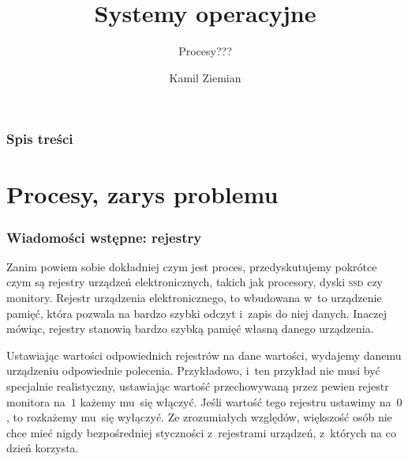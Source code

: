 \documentclass[10pt,t]{beamer}
\title{Systemy operacyjne}
\subtitle{Procesy???}
\author{Kamil Ziemian \\
  \email}
\begin{document}





\RaggedRight





\maketitle





\begin{frame}
  \frametitle{Spis treści}


  \tableofcontents

\end{frame}





\section{Procesy, zarys problemu}


\begin{frame}
  \frametitle{Wiadomości wstępne: rejestry}


  Zanim powiem sobie dokładniej czym jest proces, przedyskutujemy pokrótce
  czym są rejestry urządzeń elektronicznych, takich jak procesory, dyski
  \textsc{ssd} czy monitory. Rejestr urządzenia elektronicznego, to
  wbudowana w~to urządzenie pamięć, która pozwala na bardzo szybki odczyt
  i~zapis do niej danych. Inaczej mówiąc, rejestry stanowią bardzo szybką
  pamięć własną danego urządzenia.

  Ustawiając wartości odpowiednich rejestrów na dane wartości, wydajemy
  danemu urządzeniu odpowiednie polecenia. Przykładowo, i~ten przykład nie
  musi być specjalnie realistyczny, ustawiając wartość przechowywaną przez
  pewien rejestr monitora na~$1$ każemy mu~się włączyć. Jeśli wartość tego
  rejestru ustawimy na~$0$, to rozkażemy mu~się wyłączyć. Ze zrozumiałych
  względów, większość osób nie chce mieć nigdy bezpośredniej styczności
  z~rejestrami urządzeń, z~których na co dzień korzysta.

\end{frame}
\end{document}

